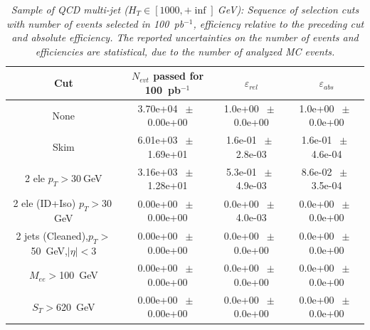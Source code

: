 \begin{table}[htbp] 
\begin{center} 
\begin{tabular}{|c|c|c|c|} 
\hline\hline 
 Cut & $N_{evt}$ passed for 100~pb$^{-1}$ & $\varepsilon_{rel}$ & $\varepsilon_{abs}$ \\ 
\hline\hline 
None       &        3.70e+04       $~\pm~$       0.00e+00        &        1.0e+00       $~\pm~$       0.0e+00        &        1.0e+00       $~\pm~$       0.0e+00       \\       
       Skim       &        6.01e+03       $~\pm~$       1.69e+01        &        1.6e-01       $~\pm~$       2.8e-03        &        1.6e-01       $~\pm~$       4.6e-04       \\       
       2 ele $p_T>30~$GeV       &        3.16e+03       $~\pm~$       1.28e+01        &        5.3e-01       $~\pm~$       4.9e-03        &        8.6e-02       $~\pm~$       3.5e-04       \\       
       2 ele (ID+Iso) $p_T>30~$GeV       &        0.00e+00       $~\pm~$       0.00e+00        &        0.0e+00       $~\pm~$       4.0e-03        &        0.0e+00       $~\pm~$       0.0e+00       \\       
       2 jets (Cleaned),$p_T>$50~GeV,$|\eta|<$3       &        0.00e+00       $~\pm~$       0.00e+00        &        0.0e+00       $~\pm~$       0.0e+00        &        0.0e+00       $~\pm~$       0.0e+00       \\       
       $M_{ee}>$100~GeV       &        0.00e+00       $~\pm~$       0.00e+00        &        0.0e+00       $~\pm~$       0.0e+00        &        0.0e+00       $~\pm~$       0.0e+00       \\       
       $S_T>$620~GeV       &        0.00e+00       $~\pm~$       0.00e+00        &        0.0e+00       $~\pm~$       0.0e+00        &        0.0e+00       $~\pm~$       0.0e+00       \\       
       \hline\hline 
\end{tabular} 
\end{center} 
\caption{\small \sl Sample of QCD multi-jet ($H_T \in [1000,+\inf]~$GeV): Sequence of selection cuts with number of events selected in 100~pb$^{-1}$, efficiency relative to the preceding cut and absolute efficiency. The reported uncertainties on the number of events and efficiencies are statistical, due to the number of analyzed MC events.} 
\label{tab:effic-QCD-1000-inf} 
\end{table} 

